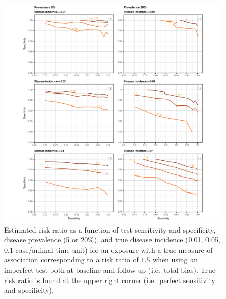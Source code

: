\documentclass[utf8]{frontiers_suppmat} %
\begin{document}
\begin{figure}[htbp]
  \begin{center}
    \includegraphics[scale=.95]{master-risk15_contour-1}
  \end{center}
  \caption{Estimated risk ratio as a function of test sensitivity and
    specificity, disease prevalence (5 or 20\%), and true disease incidence
    (0.01, 0.05, 0.1 case/animal-time unit) for an exposure with a true measure
    of association corresponding to a risk ratio of \(1.5\) when using an
    imperfect test both at baseline and follow-up (i.e.\ total bias). True risk
    ratio is found at the upper right corner (i.e.\ perfect sensitivity and
    specificity).}
  \label{fig:incidence_risk15}
\end{figure}
\end{document}
